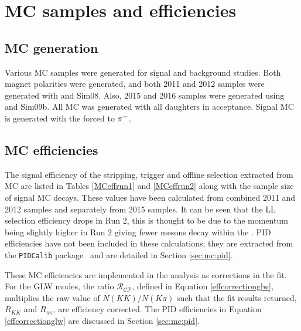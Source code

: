 \clearpage
%

\chapter{\label{ch:5-mcefficiencies}MC samples and efficiencies} 

\minitoc

\section{MC generation}

Various MC samples were generated for signal and background studies. Both magnet polarities were generated, and both 2011 and 2012 samples were generated with  and Sim08. Also, 2015 and 2016 samples were generated using  and Sim09b. All MC was generated with all daughters in \lhcb acceptance. Signal MC is generated with the \Kstarm forced to \KS${{\pi}^-}$.

\section{MC efficiencies}
\label{sec:mc:efficiencies}

The signal efficiency of the stripping, trigger and offline selection extracted from MC are listed in Tables \ref{MCeffrun1} and \ref{MCeffrun2} along with the sample size of signal MC decays. These values have been calculated from combined 2011 and 2012 samples and separately from 2015 samples. It can be seen that the LL selection efficiency drops in Run 2, this is thought to be due to the \KS momentum being slightly higher in Run 2 giving fewer \KS mesons decay within the \velo. PID efficiencies have not been included in these calculations; they are extracted from the {\tt PIDCalib} package~\cite{PIDCalib} and are detailed in Section \ref{sec:mc:pid}.

These MC efficiencies are implemented in the analysis as corrections in the \CP fit. For the GLW modes, the ratio $\mathcal{R_{CP}}$, defined in Equation \ref{effcorrectionglw}, multiplies the raw value of $N(KK)/N(K\pi)$ such that the fit results returned, $R_{KK}$ and $R_{\pi\pi}$, are efficiency corrected. The PID efficiencies in Equation \ref{effcorrectionglw} are discussed in Section \ref{sec:mc:pid}.

